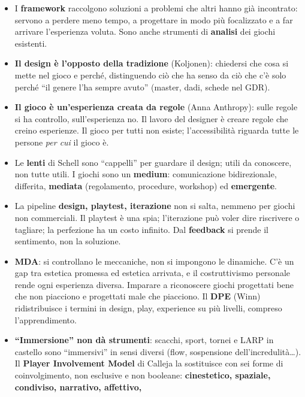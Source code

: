 \begin{itemize}
  \item I \textbf{framework} raccolgono soluzioni a problemi che altri hanno già
        incontrato: servono a perdere meno tempo, a progettare in modo più
        focalizzato e a far arrivare l'esperienza voluta. Sono anche
        strumenti di \textbf{analisi} dei giochi esistenti.
  \item \textbf{Il design è l'opposto della tradizione} (Koljonen): chiedersi
        che cosa si mette nel gioco e perché, distinguendo ciò che ha senso da
        ciò che c'è solo perché ``il genere l'ha sempre avuto'' (master, dadi,
        schede nel GDR).
  \item \textbf{Il gioco è un'esperienza creata da regole} (Anna Anthropy): sulle
        regole si ha controllo, sull'esperienza no. Il lavoro del designer è
        creare regole che creino esperienze. Il gioco per tutti non esiste;
        l'accessibilità riguarda tutte le persone \emph{per cui} il gioco è.
  \item Le \textbf{lenti} di Schell sono ``cappelli'' per guardare il design;
        utili da conoscere, non tutte utili. I giochi sono un \textbf{medium}:
        comunicazione bidirezionale, differita, \textbf{mediata} (regolamento,
        procedure, workshop) ed \textbf{emergente}.
  \item La pipeline \textbf{design, playtest, iterazione} non si salta, nemmeno
        per giochi non commerciali. Il playtest è una spia; l'iterazione può
        voler dire riscrivere o tagliare; la perfezione ha un costo infinito.
        Dal \textbf{feedback} si prende il sentimento, non la soluzione.
  \item \textbf{MDA}: si controllano le meccaniche, non si impongono le
        dinamiche. C'è un gap tra estetica promessa ed estetica arrivata, e il
        costruttivismo personale rende ogni esperienza diversa. Imparare a
        riconoscere giochi progettati bene che non piacciono e progettati male
        che piacciono. Il \textbf{DPE} (Winn) ridistribuisce i termini in design,
        play, experience su più livelli, compreso l'apprendimento.
  \item \textbf{``Immersione'' non dà strumenti}: scacchi, sport, tornei e LARP
        in castello sono ``immersivi'' in sensi diversi (flow, sospensione
        dell'incredulità\ldots). Il \textbf{Player Involvement Model} di Calleja
        la sostituisce con sei forme di coinvolgimento, non esclusive e non
        booleane: \textbf{cinestetico, spaziale, condiviso, narrativo, affettivo,
}
\end{itemize}
